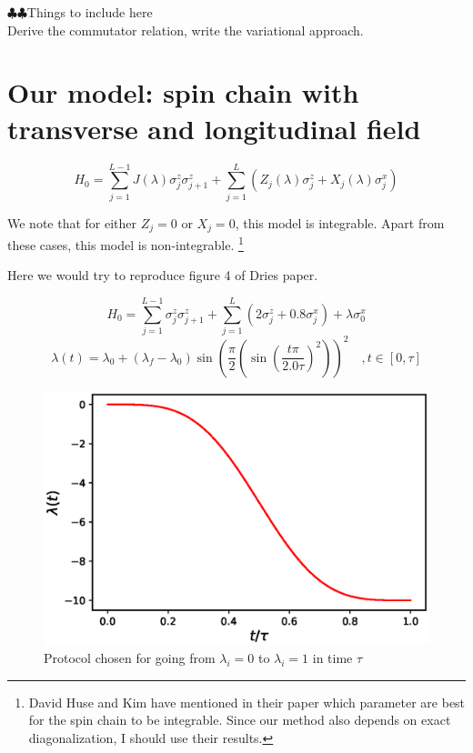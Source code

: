 \documentclass[11pt,a4paper]{article}
\begin{document}
$\clubsuit \clubsuit $Things to include here \\
Derive the commutator relation, write the variational approach.

\section{Our model: spin chain with transverse and longitudinal field}

\begin{equation}
H_0=\sum_{j=1}^{L-1} J(\lambda) \sigma_j^z \sigma_{j+1}^z + \sum_{j=1}^{L}  (Z_j (\lambda) \sigma_j^z +X_j (\lambda) \sigma_j^x)
\end{equation}

We note that for either $Z_j=0$ or $X_j=0$, this model is integrable. Apart from these cases, this model is non-integrable. \footnote{David Huse and Kim have mentioned in their paper which parameter are best for the spin chain to be integrable. Since our method also depends on exact diagonalization, I should use their results.}


Here we would try to reproduce figure 4 of Dries paper.

\begin{equation}
H_0=\sum_{j=1}^{L-1}  \sigma_j^z \sigma_{j+1}^z + \sum_{j=1}^{L} (2\sigma_j^z + 0.8 \sigma_j^x ) + \lambda \sigma_0^x
\end{equation}
\begin{equation}
\lambda(t) = \lambda_0 + (\lambda_f-\lambda_0)\sin\left(\dfrac{\pi}{2}\left(\sin(\dfrac{t\pi}{2.0 \tau})^2 \right) \right)^2 \quad, t \in [0, \tau]
\end{equation}
\begin{figure}
\centering
\includegraphics[scale=0.67]{protocol.eps}
\caption{Protocol chosen for going from $\lambda_i=0$ to $\lambda_i=1$ in time $\tau$}
\end{figure}
\end{document}
